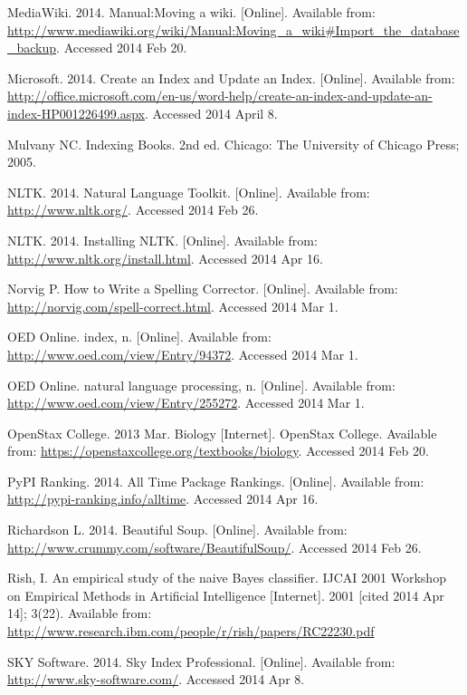 \begin{thebibliography}{99}
MediaWiki. 2014. Manual:Moving a wiki. [Online]. Available from: \url{http://www.mediawiki.org/wiki/Manual:Moving_a_wiki#Import_the_database_backup}. Accessed 2014 Feb 20.

Microsoft. 2014. Create an Index and Update an Index. [Online]. Available from: \url{http://office.microsoft.com/en-us/word-help/create-an-index-and-update-an-index-HP001226499.aspx}. Accessed 2014 April 8.

Mulvany NC. Indexing Books. 2nd ed. Chicago: The University of Chicago Press; 2005.

NLTK. 2014. Natural Language Toolkit. [Online]. Available from: \url{http://www.nltk.org/}. Accessed 2014 Feb 26.

NLTK. 2014. Installing NLTK. [Online]. Available from: \url{http://www.nltk.org/install.html}. Accessed 2014 Apr 16.

Norvig P. How to Write a Spelling Corrector. [Online]. Available from: \url{http://norvig.com/spell-correct.html}. Accessed 2014 Mar 1.

OED Online. index, n. [Online]. Available from: \url{http://www.oed.com/view/Entry/94372}. Accessed 2014 Mar 1.

OED Online. natural language processing, n. [Online]. Available from: \url{http://www.oed.com/view/Entry/255272}. Accessed 2014 Mar 1.

OpenStax College. 2013 Mar. Biology [Internet]. OpenStax College. Available from: \url{https://openstaxcollege.org/textbooks/biology}. Accessed 2014 Feb 20.

PyPI Ranking. 2014. All Time Package Rankings. [Online]. Available from: \url{http://pypi-ranking.info/alltime}. Accessed 2014 Apr 16.

Richardson L. 2014. Beautiful Soup. [Online]. Available from: \url{http://www.crummy.com/software/BeautifulSoup/}. Accessed 2014 Feb 26.

Rish, I. An empirical study of the naive Bayes classifier. IJCAI 2001 Workshop on Empirical Methods in Artificial Intelligence [Internet]. 2001 [cited 2014 Apr 14]; 3(22). Available from: \url{http://www.research.ibm.com/people/r/rish/papers/RC22230.pdf}

SKY Software. 2014. Sky Index Professional. [Online]. Available from: \url{http://www.sky-software.com/}. Accessed 2014 Apr 8.


\end{thebibliography}
